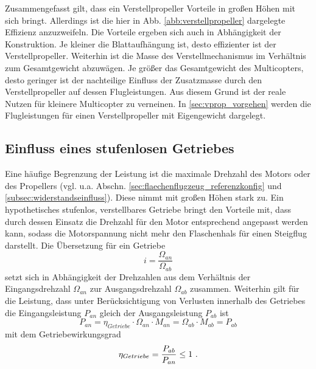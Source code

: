 Zusammengefasst gilt, dass ein Verstellpropeller Vorteile in großen Höhen mit sich bringt. Allerdings ist die hier in Abb. \ref{abb:verstellpropeller} dargelegte Effizienz anzuzweifeln. Die Vorteile ergeben sich auch in Abhängigkeit der Konstruktion. Je kleiner die Blattaufhängung ist, desto effizienter ist der Verstellpropeller. Weiterhin ist die Masse des Verstellmechanismus im Verhältnis zum Gesamtgewicht abzuwägen. Je größer das Gesamtgewicht des Multicopters, desto geringer ist der nachteilige Einfluss der Zusatzmasse durch den Verstellpropeller auf dessen Flugleistungen. Aus diesem Grund ist der reale Nutzen für kleinere Multicopter zu verneinen. 
In \ref{sec:vprop_vorgehen} werden die Flugleistungen für einen Verstellpropeller mit Eigengewicht dargelegt. 



\subsection{Einfluss eines stufenlosen Getriebes}
\label{subsec:getriebe}
Eine häufige Begrenzung der Leistung ist die maximale Drehzahl des Motors oder des Propellers (vgl. u.a. Abschn. \ref{sec:flaechenflugzeug_referenzkonfig} und \ref{subsec:widerstandseinfluss}). Diese nimmt mit großen Höhen stark zu. Ein hypothetisches stufenlos, verstellbares Getriebe bringt den Vorteile mit, dass durch dessen Einsatz die Drehzahl für den Motor entsprechend angepasst werden kann, sodass die Motorspannung nicht mehr den Flaschenhals für einen Steigflug darstellt.
Die Übersetzung für ein Getriebe 
\begin{equation}
	i = \frac{\Omega_{an}}{\Omega_{ab}} 
	\label{eq:getriebe_uebersetzung}
\end{equation}
setzt sich in Abhängigkeit der Drehzahlen aus dem Verhältnis der Eingangsdrehzahl \ensuremath{\Omega_{an}} zur Ausgangsdrehzahl \ensuremath{\Omega_{ab}} zusammen. Weiterhin gilt für die Leistung, dass unter Berücksichtigung von Verlusten innerhalb des Getriebes die Eingangsleistung \ensuremath{P_{an}} gleich der Ausgangsleistung \ensuremath{P_{ab}} ist
\begin{equation}
	P_{an} = \eta_{Getriebe} \cdot \Omega_{an}\cdot M_{an} = \Omega_{ab}\cdot M_{ab} = P_{ab}
	\label{eq:getriebe_leistung}
\end{equation} 
mit dem Getriebewirkungsgrad 
\begin{equation}
	\eta_{Getriebe} = \frac{P_{ab}}{P_{an}} \leq 1 ~\text{.}
	\label{eq:getriebe_wirkungsgrad}
\end{equation}
